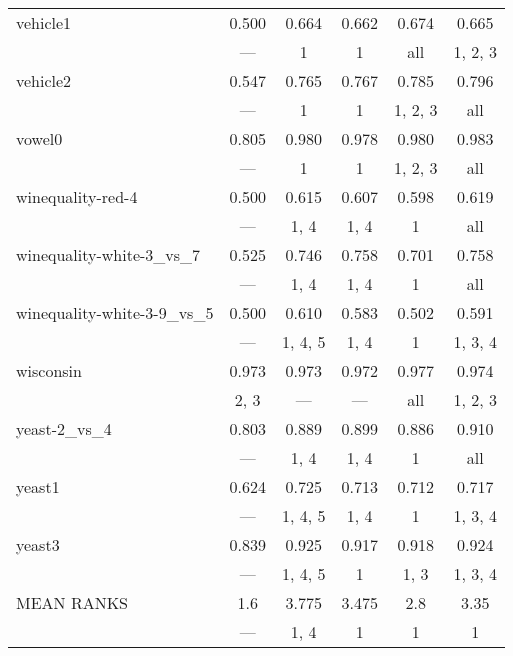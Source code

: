 \begin{tabular}{lccccc}
 vehicle1                   & 0.500   & 0.664   & 0.662   & 0.674    & 0.665    \\
                            & ---     & 1       & 1       & all      & 1, 2, 3  \\
 vehicle2                   & 0.547   & 0.765   & 0.767   & 0.785    & 0.796    \\
                            & ---     & 1       & 1       & 1, 2, 3  & all      \\
 vowel0                     & 0.805   & 0.980   & 0.978   & 0.980    & 0.983    \\
                            & ---     & 1       & 1       & 1, 2, 3  & all      \\
 winequality-red-4          & 0.500   & 0.615   & 0.607   & 0.598    & 0.619    \\
                            & ---     & 1, 4    & 1, 4    & 1        & all      \\
 winequality-white-3\_vs\_7   & 0.525   & 0.746   & 0.758   & 0.701    & 0.758    \\
                            & ---     & 1, 4    & 1, 4    & 1        & all      \\
 winequality-white-3-9\_vs\_5 & 0.500   & 0.610   & 0.583   & 0.502    & 0.591    \\
                            & ---     & 1, 4, 5 & 1, 4    & 1        & 1, 3, 4  \\
 wisconsin                  & 0.973   & 0.973   & 0.972   & 0.977    & 0.974    \\
                            & 2, 3    & ---     & ---     & all      & 1, 2, 3  \\
 yeast-2\_vs\_4               & 0.803   & 0.889   & 0.899   & 0.886    & 0.910    \\
                            & ---     & 1, 4    & 1, 4    & 1        & all      \\
 yeast1                     & 0.624   & 0.725   & 0.713   & 0.712    & 0.717    \\
                            & ---     & 1, 4, 5 & 1, 4    & 1        & 1, 3, 4  \\
 yeast3                     & 0.839   & 0.925   & 0.917   & 0.918    & 0.924    \\
                            & ---     & 1, 4, 5 & 1       & 1, 3     & 1, 3, 4  \\
 \hline
MEAN RANKS                 & 1.6     & 3.775   & 3.475   & 2.8      & 3.35     \\
                            & ---     & 1, 4    & 1       & 1        & 1        \\
\hline
\end{tabular}